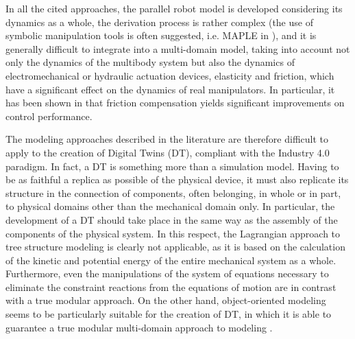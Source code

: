 \documentclass[]{interact}
\theoremstyle{plain}%
\theoremstyle{definition}
\theoremstyle{remark}
\begin{document}
In all the cited approaches, the parallel robot model is developed considering its dynamics as a whole, the derivation process is rather complex (the use of symbolic manipulation tools is often suggested, i.e. MAPLE in \cite{XDZ16}), and it is generally difficult to integrate into a multi-domain model, taking into account not only the dynamics of the multibody system but also the dynamics of electromechanical or hydraulic actuation devices, elasticity and friction, which have a significant effect on the dynamics of real manipulators. In particular, it has been shown in \cite{Grotjahn2004} that friction compensation yields significant improvements on control performance. 

The modeling approaches described in the literature are therefore difficult to apply to the creation of Digital Twins (DT), compliant with the Industry 4.0 paradigm. In fact, a DT is something more than a simulation model. Having to be as faithful a replica as possible of the physical device, it must also replicate its structure in the connection of components, often belonging, in whole or in part, to physical domains other than the mechanical domain only. In particular, the development of a DT should take place in the same way as the assembly of the components of the physical system. In this respect, the Lagrangian approach to tree structure modeling is clearly not applicable, as it is based on the calculation of the kinetic and potential energy of the entire mechanical system as a whole. Furthermore, even the manipulations of the system of equations necessary to eliminate the constraint reactions from the equations of motion are in contrast with a true modular approach. On the other hand, object-oriented modeling seems to be particularly suitable for the creation of DT, in which it is able to guarantee a true modular multi-domain approach to modeling \cite{SF18}.
\end{document}
